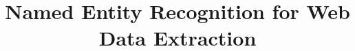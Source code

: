 \documentclass{nle}
\begin{document}
\title{Named Entity Recognition for Web Data Extraction}


% 

\maketitle
\end{document}
